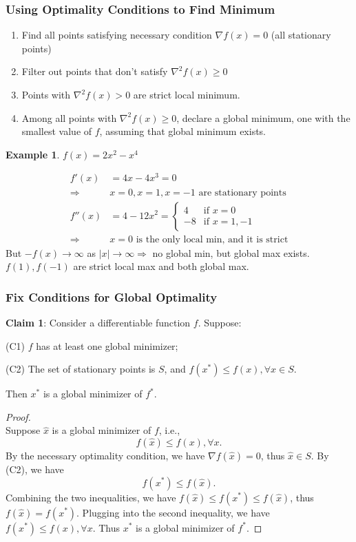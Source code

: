 \documentclass[11pt,a4paper]{article}
\newtheorem{example}{Example}
\begin{document}
\subsubsection{Using Optimality Conditions to Find Minimum}
\begin{enumerate}
    \item Find all points satisfying necessary condition $\nabla f(x)=0$ (all stationary points)
    \item Filter out points that don't satisfy $\nabla^2 f(x)\geq 0$
    \item Points with $\nabla^2 f(x)> 0$ are strict local minimum.
    \item Among all points with $\nabla^2 f(x)\geq 0$, declare a global minimum, one with the smallest value of $f$, assuming that global minimum exists.
\end{enumerate}
\begin{example}
$f(x)=2x^2-x^4$
\end{example}
\begin{equation}
    \begin{aligned}
        f'(x)&=4x-4x^3=0\\
        \Rightarrow& x=0,x=1,x=-1\text{ are stationary points}\\
        f''(x)&=4-12x^2=\left\{\begin{matrix}
            4&\text{if }x=0\\
            -8&\text{if }x=1,-1
        \end{matrix}\right.\\
        \Rightarrow	&x=0\text{ is the only local min, and it is strict}
    \end{aligned}
    \nonumber
\end{equation}
But $-f(x) \rightarrow \infty$ as $|x|\rightarrow \infty \Rightarrow$ no global min, but global max exists. $f(1),f(-1)$ are strict local max and both global max.

\subsubsection{Fix Conditions for Global Optimality}
\textbf{Claim 1}: Consider a differentiable function $f$. Suppose:

(C1) $f$ has at least one global minimizer;

(C2) The set of stationary points is $S$, and $f\left(x^{*}\right) \leq f(x), \forall x \in S$.

Then $x^{*}$ is a global minimizer of $f^{*}$.
\begin{proof}
\quad\\
Suppose $\hat{x}$ is a global minimizer of $f$, i.e.,
$$
f(\hat{x}) \leq f(x), \forall x .
$$
By the necessary optimality condition, we have $\nabla f(\hat{x})=0$, thus $\hat{x} \in S$. By (C2), we have
$$
f\left(x^{*}\right) \leq f(\hat{x}) .
$$
Combining the two inequalities, we have $f(\hat{x}) \leq f\left(x^{*}\right) \leq f(\hat{x})$, thus $f(\hat{x})=f\left(x^{*}\right)$. Plugging into the second inequality, we have $f\left(x^{*}\right) \leq f(x), \forall x$. Thus $x^{*}$ is a global minimizer of $f^{*} .$
\end{proof}
\end{document}
